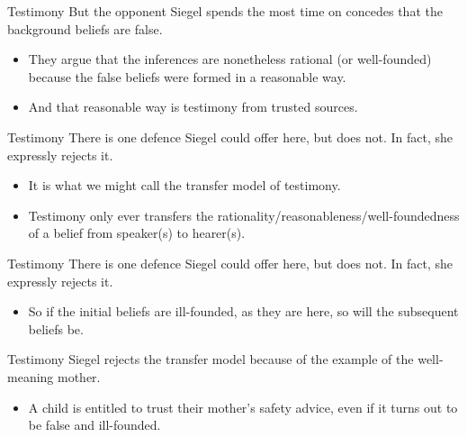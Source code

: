 \documentclass[
  17pt,
  letterpaper,
  ignorenonframetext,
  aspectratio=169,
  xcolor={dvipsnames}]{beamer}
\providecommand{\tightlist}{%
  \setlength{\itemsep}{0pt}\setlength{\parskip}{0pt}}\usepackage{longtable,booktabs,array}
\begin{document}
\begin{frame}{Testimony}
\protect\hypertarget{testimony}{}
But the opponent Siegel spends the most time on concedes that the
background beliefs are false.

\begin{itemize}[<+->]
\tightlist
\item
  They argue that the inferences are nonetheless rational (or
  well-founded) because the false beliefs were formed in a reasonable
  way.
\item
  And that reasonable way is testimony from trusted sources.
\end{itemize}
\end{frame}

\begin{frame}{Testimony}
\protect\hypertarget{testimony-1}{}
There is one defence Siegel could offer here, but does not. In fact, she
expressly rejects it.

\begin{itemize}[<+->]
\tightlist
\item
  It is what we might call the transfer model of testimony.
\item
  Testimony only ever transfers the
  rationality/reasonableness/well-foundedness of a belief from
  speaker(s) to hearer(s).
\end{itemize}
\end{frame}

\begin{frame}{Testimony}
\protect\hypertarget{testimony-2}{}
There is one defence Siegel could offer here, but does not. In fact, she
expressly rejects it.

\begin{itemize}[<+->]
\tightlist
\item
  So if the initial beliefs are ill-founded, as they are here, so will
  the subsequent beliefs be.
\end{itemize}
\end{frame}

\begin{frame}{Testimony}
\protect\hypertarget{testimony-3}{}
Siegel rejects the transfer model because of the example of the
well-meaning mother.

\begin{itemize}[<+->]
\tightlist
\item
  A child is entitled to trust their mother's safety advice, even if it
  turns out to be false and ill-founded.
\end{itemize}
\end{frame}
\end{document}
